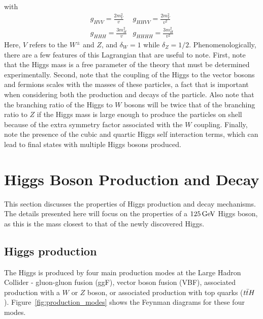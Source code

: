 %
with 
%
\begin{equation}
\begin{array}{cc}
g_{HVV} = \frac{2m_V^2}{v} & g_{HHVV} = \frac{2m_V^2}{v^2} \\ 
g_{HHH} = \frac{3m_H^2}{v} & g_{HHHH} = \frac{3m_H^2}{v^2}
\end{array}
\end{equation}
%
Here, $V$ refers to the $W^{\pm}$ and $Z$, and $\delta_{W} = 1$ while $\delta_Z = 1/2$. Phenomenologically, there are a few features of this Lagrangian that are useful to note. First, note that the Higgs mass is a free parameter of the theory that must be determined experimentally. Second, note that the coupling of the Higgs to the vector bosons and fermions scales with the masses of these particles, a fact that is important when considering both the production and decays of the particle. Also note that the branching ratio of the Higgs to $W$ bosons will be twice that of the branching ratio to $Z$ if the Higgs mass is large enough to produce the particles on shell because of the extra symmetry factor associated with the $W$ coupling. Finally, note the presence of the cubic and quartic Higgs self interaction terms, which can lead to final states with multiple Higgs bosons produced. 

\section{Higgs Boson Production and Decay}

This section discusses the properties of Higgs production and decay mechanisms. The details presented here will focus on the properties of a $125 \GeV$ Higgs boson, as this is the mass closest to that of the newly discovered Higgs. 

\subsection{Higgs production}

The Higgs is produced by four main production modes at the Large Hadron Collider - gluon-gluon fusion (ggF), vector boson fusion (VBF), associated production with a $W$ or $Z$ boson, or associated production with top quarks ($t\bar{t} H$). Figure~\ref{fig:production_modes} shows the Feynman diagrams for these four modes. 

